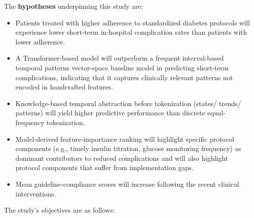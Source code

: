 \documentclass[
]{article}
\begin{document}
The \textbf{hypotheses} underpinning this study are:

\begin{itemize}
\item
  Patients treated with higher adherence to standardized diabetes
  protocols will experience lower short‑term in‑hospital complication
  rates than patients with lower adherence.
\item
  A Transformer‑based model will outperform a frequent interval-based
  temporal patterns vector-space baseline model in predicting short‑term
  complications, indicating that it captures clinically relevant
  patterns not encoded in handcrafted features.
\item
  Knowledge-based temporal abstraction before tokenization (states/
  trends/ patterns) will yield higher predictive performance than
  discrete equal-frequency tokenization.
\item
  Model‑derived feature‑importance ranking will highlight specific
  protocol components (e.g., timely insulin titration, glucose
  monitoring frequency) as dominant contributors to reduced
  complications and will also highlight protocol components that suffer
  from implementation gaps.
\item
  Mean guideline‑compliance scores will increase following the recent
  clinical interventions.
\end{itemize}

The study's objectives are as follows:
\end{document}
